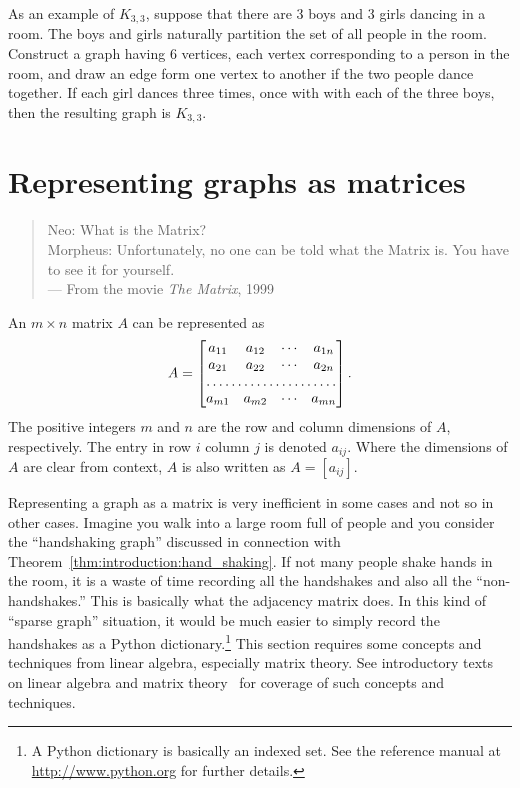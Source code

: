 As an example of $K_{3,3}$, suppose that there are $3$ boys and $3$
girls dancing in a room. The boys and girls naturally partition the
set of all people in the room. Construct a graph having $6$ vertices,
each vertex corresponding to a person in the room, and draw an edge
form one vertex to another if the two people dance together. If each
girl dances three times, once with with each of the three boys, then
the resulting graph is $K_{3,3}$.



\section{Representing graphs as matrices}
\label{sec:introduction:matrix_representation}

\begin{quote}
\footnotesize
Neo: What is the Matrix? \\
Morpheus: Unfortunately, no one can be told what the Matrix is. You
have to see it for yourself. \\
\noindent
--- From the movie \emph{The Matrix}, 1999
\end{quote}

\noindent
An $m \times n$ matrix $A$ can be represented as
\[
A
=
\begin{bmatrix}
a_{11} & a_{12} & \cdots & a_{1n} \\
a_{21} & a_{22} & \cdots & a_{2n} \\
\hdotsfor{4} \\
a_{m1} & a_{m2} & \cdots & a_{mn} \\
\end{bmatrix}.
\]
The positive integers $m$ and $n$ are the row and column dimensions of
$A$, respectively. The entry in row $i$ column $j$ is denoted
$a_{ij}$. Where the dimensions of $A$ are clear from context, $A$ is
also written as $A = [a_{ij}]$.

Representing a graph as a matrix is very inefficient in some cases and
not so in other cases. Imagine you walk into a large room full of
people and you consider the ``handshaking graph'' discussed in
connection with Theorem~\ref{thm:introduction:hand_shaking}. If not
many people shake hands in the room, it is a waste of time recording
all the handshakes and also all the ``non-handshakes.'' This is
basically what the adjacency matrix does. In this kind of
``sparse graph'' situation, it would be much
easier to simply record the handshakes as a Python
dictionary.\footnote{
  A Python dictionary is basically an indexed set. See
  the reference manual at \url{http://www.python.org} for further
  details.
}
This section requires some concepts and techniques from linear
algebra, especially matrix theory. See introductory texts on linear
algebra and matrix theory~\cite{Beezer2009} for coverage of such
concepts and techniques.


